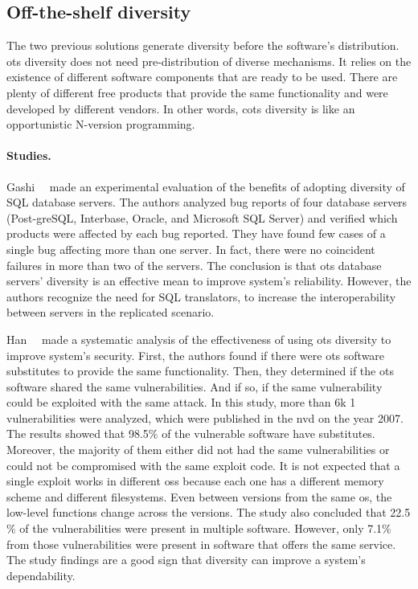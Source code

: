  


\subsection{Off-the-shelf diversity}
The two previous solutions generate diversity before the software’s distribution. 
\gls{ots} diversity does not need pre-distribution of diverse mechanisms. 
It relies on the existence of different software components that are ready to be used.
There are plenty of different free products that provide the same functionality and were developed by different vendors. 
In other words, \gls{cots} diversity is like an opportunistic N-version programming.




\paragraph{Studies.}
Gashi~\etal{}~\cite{Gashi:2007} made an experimental evaluation of the benefits of adopting diversity of SQL database servers. 
The authors analyzed bug reports of four database servers (Post-greSQL, Interbase, Oracle, and Microsoft SQL Server) and verified which products were affected by each bug reported. 
They have found few cases of a single bug affecting more than one server. 
In fact, there were no coincident failures in more than two of the servers.
The conclusion is that \gls{ots} database servers’ diversity is an effective mean to improve system's reliability. 
However, the authors recognize the need for SQL translators, to increase the interoperability between servers in the replicated scenario.

Han~\etal{}~\cite{Han:2009} made a systematic analysis of the effectiveness of using \gls{ots} diversity to improve system's security. 
First, the authors found if there were \gls{ots} software substitutes to provide the same functionality. 
Then, they determined if the \gls{ots} software shared the same vulnerabilities.
And if so, if the same vulnerability could be exploited with the same attack. 
In this study, more than 6k 1 vulnerabilities were analyzed, which were published in the \gls{nvd} on the year 2007. 
The results showed that 98.5$\%$ of the vulnerable software have substitutes. 
Moreover, the majority of them either did not had the same vulnerabilities or could not be compromised with the same exploit code. 
It is not expected that a single exploit works in different \glspl{os} because each one has a different memory scheme and different filesystems. 
Even between versions from the same \gls{os}, the low-level functions change across the versions. 
The study also concluded that 22.5$\%$ of the vulnerabilities were present in multiple software. 
However, only 7.1$\%$ from those vulnerabilities were present in software that offers the same service. 
The study findings are a good sign that diversity can improve a system’s dependability.


